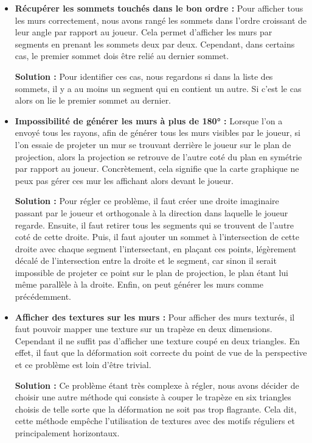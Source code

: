 \documentclass[11pt]{article}
\begin{document}
\begin{itemize}
	\item \textbf{Récupérer les sommets touchés dans le bon ordre :} Pour afficher tous les murs correctement,
	nous avons rangé les sommets dans l'ordre croissant de leur angle par rapport au joueur. Cela permet d'afficher
	les murs par segments en prenant les sommets deux par deux. Cependant, dans certains cas, le premier sommet 
	dois être relié au dernier sommet.

	\textbf{Solution : }Pour identifier ces cas, nous regardons si dans la liste des sommets, il y a au moins
	un segment qui en contient un autre. Si c'est le cas alors on lie le premier sommet au dernier.

	\item \textbf{Impossibilité de générer les murs à plus de 180° :} Lorsque l'on a envoyé tous les rayons,
	afin de générer tous les murs visibles par le joueur, si l'on essaie de projeter un mur se trouvant derrière
	le joueur sur le plan de projection, alors la projection se retrouve de l'autre coté du plan en symétrie 
	par rapport au joueur. Concrètement, cela signifie que la carte graphique ne peux pas gérer ces mur les
	affichant alors devant le joueur.

	\textbf{Solution : }Pour régler ce problème, il faut créer une droite imaginaire passant par le 
	joueur et orthogonale à la direction dans laquelle le joueur regarde. Ensuite, il faut retirer
	tous les segments qui se trouvent de l'autre coté de cette droite. Puis, il faut ajouter un sommet
	à l'intersection de cette droite avec chaque segment l'intersectant, en plaçant ces points, 
	légèrement décalé de l'intersection entre la droite et le segment, car sinon il serait impossible de
	projeter ce point sur le plan de projection, le plan étant lui même parallèle à la droite. Enfin, 
	on peut générer les murs comme précédemment.

	\item \textbf{Afficher des textures sur les murs :} Pour afficher des murs texturés, il faut
	pouvoir mapper une texture sur un trapèze en deux dimensions. Cependant il ne suffit pas d'afficher 
	une texture coupé en deux triangles. En effet, il faut que la déformation soit correcte
	du point de vue de la perspective et ce problème est loin d'être trivial.

	\textbf{Solution : }Ce problème étant très complexe à régler, nous avons décider de choisir
	une autre méthode qui consiste à couper le trapèze en six triangles choisis de telle 
	sorte que la déformation ne soit pas trop flagrante. Cela dit, cette méthode empêche 
	l'utilisation de textures avec des motifs réguliers et principalement horizontaux.
\end{itemize}
\end{document}
